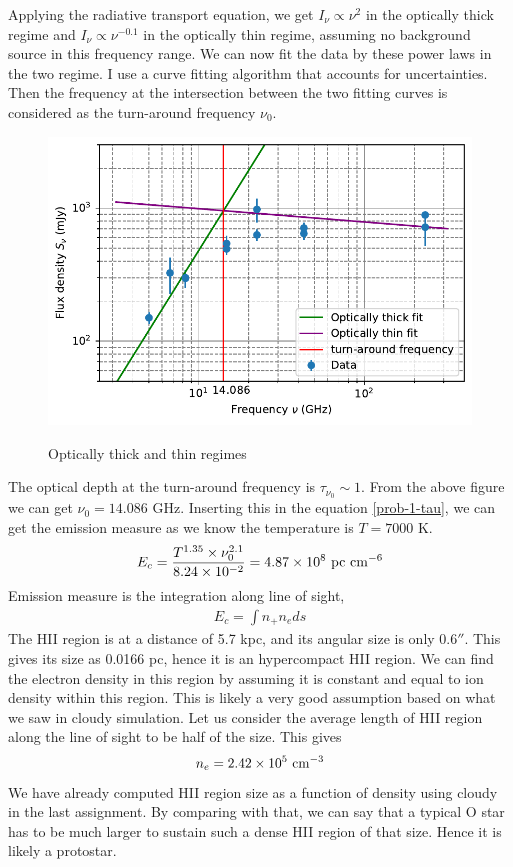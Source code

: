 \documentclass{jhwhw}
\begin{document}
Applying the radiative transport equation, we get $I_{\nu} \propto \nu^2$ in the optically thick regime and $I_{\nu} \propto \nu^{-0.1}$ in the optically thin regime, assuming no background source in this frequency range. We can now fit the data by these power laws in the two regime. I use a curve fitting algorithm that accounts for uncertainties. Then the frequency  at the intersection between the two fitting curves is considered as the turn-around frequency $\nu_{0}$.


\begin{figure}[H]
\centering
\caption{Optically thick and thin regimes}
\includegraphics[width=1\linewidth]{../prob-1-plot2}
\label{fig:prob-1-plot2}
\end{figure}


The optical depth at the turn-around frequency is $\tau_{\nu_{0}} \sim 1$. From the above figure we can get $\nu_{0}=14.086$ GHz. Inserting this in the equation \ref{prob-1-tau}, we can get the emission measure as we know the temperature is $T=7000$ K.
\begin{align}
E_c = \frac{T^{1.35} \times \nu_0^{2.1}}{8.24 \times 10^{-2}} = 4.87 \times 10^{8} ~\rm{pc ~cm^{-6}}
\end{align}
Emission measure is the integration along line of sight,
\begin{align}
E_c = \int n_+ n_e ds
\end{align}
The HII region is at a distance of 5.7 kpc, and its angular size is only $0.6''$. This gives its size as 0.0166 pc, hence it is an hypercompact HII region. We can find the electron density in this region by assuming it is constant and equal to ion density within this region. This is likely a very good assumption based on what we saw in cloudy simulation. Let us consider the average length of HII region along the line of sight to be half of the size. This gives
\begin{align}
n_e = 2.42 \times 10^5 ~\rm{cm^{-3}}
\end{align}
We have already computed HII region size as a function of density using cloudy in the last assignment. By comparing with that, we can say that a typical O star has to be much larger to sustain such a dense HII region of that size. Hence it is likely a protostar.
\end{document}
